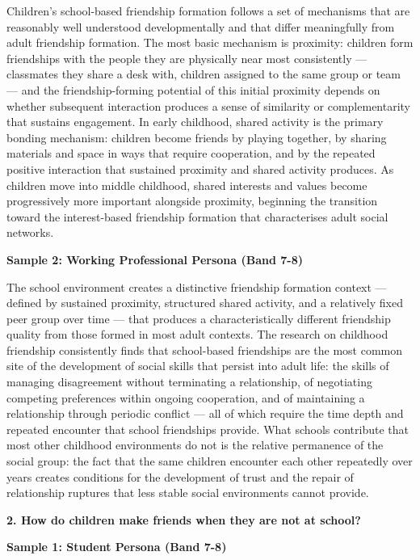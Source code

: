 Children's school-based friendship formation follows a set of mechanisms that are reasonably well understood developmentally and that differ meaningfully from adult friendship formation. The most basic mechanism is proximity: children form friendships with the people they are physically near most consistently — classmates they share a desk with, children assigned to the same group or team — and the friendship-forming potential of this initial proximity depends on whether subsequent interaction produces a sense of similarity or complementarity that sustains engagement. In early childhood, shared activity is the primary bonding mechanism: children become friends by playing together, by sharing materials and space in ways that require cooperation, and by the repeated positive interaction that sustained proximity and shared activity produces. As children move into middle childhood, shared interests and values become progressively more important alongside proximity, beginning the transition toward the interest-based friendship formation that characterises adult social networks.

\textbf{Sample 2: Working Professional Persona (Band 7-8)}

The school environment creates a distinctive friendship formation context — defined by sustained proximity, structured shared activity, and a relatively fixed peer group over time — that produces a characteristically different friendship quality from those formed in most adult contexts. The research on childhood friendship consistently finds that school-based friendships are the most common site of the development of social skills that persist into adult life: the skills of managing disagreement without terminating a relationship, of negotiating competing preferences within ongoing cooperation, and of maintaining a relationship through periodic conflict — all of which require the time depth and repeated encounter that school friendships provide. What schools contribute that most other childhood environments do not is the relative permanence of the social group: the fact that the same children encounter each other repeatedly over years creates conditions for the development of trust and the repair of relationship ruptures that less stable social environments cannot provide.

\separator

\begin{ieltsquestion}
\textbf{2. How do children make friends when they are not at school?}
\end{ieltsquestion}
\textbf{Sample 1: Student Persona (Band 7-8)}

